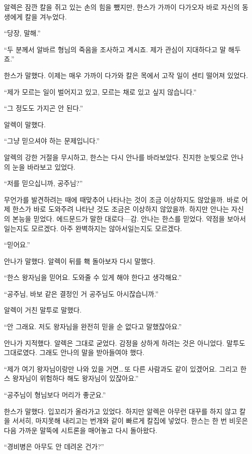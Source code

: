 알렉은 잠깐 칼을 쥐고 있는 손의 힘을 뺐지만, 한스가 가까이 다가오자 바로 자신의 동생에게 칼을 겨누었다.

``당장, 말해.''

``두 분께서 알바르 형님의 죽음을 조사하고 계시죠. 제가 관심이 지대하다고 말 해두죠.''

한스가 말했다. 이제는 매우 가까이 다가와 칼은 목에서 고작 일이 센티 떨어져 있었다.

``제가 모르는 일이 벌어지고 있고, 모르는 채로 있고 싶지 않습니다.''

``그 정도도 가지곤 안 된다.''

알렉이 말했다.

``그냥 믿으셔야 하는 문제입니다.''

알렉의 강한 거절을 무시하고, 한스는 다시 안나를 바라보았다. 진지한 눈빛으로 안나의 눈을 바라보고 있었다.

``저를 믿으십니까, 공주님?''

무언가를 발견하려는 때에 때맞추어 나타나는 것이 조금 이상하지도 않았을까. 바로 어제 한스가 바로 도와주려 나타난 것도 조금은 이상하지 않았을까. 하지만 안나는 자신의 본능을 믿었다. 에드문드가 말한 대로다—감. 안나는 한스를 믿었다. 약점을 보아서일는지도 모르겠다. 아주 완벽하지는 않아서일는지도 모르겠다.

``믿어요.''

안나가 말했다. 알렉이 뒤를 홱 돌아보자 다시 말했다.

``한스 왕자님을 믿어요. 도와줄 수 있게 해야 한다고 생각해요.''

``공주님, 바보 같은 결정인 거 공주님도 아시잖습니까.''

알렉이 거친 말투로 말했다.

``안 그래요. 저도 왕자님을 완전히 믿을 순 없다고 말했잖아요.''

안나가 지적했다. 알렉은 그대로 굳었다. 감정을 상하게 하려는 것은 아니었다. 말투도 그대로였다. 그래도 안나의 말을 받아들여야 했다.

``제가 여기 왕자님이랑만 나와 있을 거면\ldots\,또 다른 사람과도 같이 있겠어요. 그리고 한스 왕자님이 위험하다 해도 왕자님이 있잖아요.''

``공주님이 형님보다 머리가 좋군요.''

한스가 말했다. 입꼬리가 올라가고 있었다. 하지만 알렉은 아무런 대꾸를 하지 않고 칼을 서서히, 마지못해 내리고는 번개와 같이 빠르게 칼집에 넣었다. 한스는 한 번 비웃은 다음 가까운 말뚝에 시트론을 매어놓고 다시 돌아왔다.

``경비병은 아무도 안 데려온 건가?''

